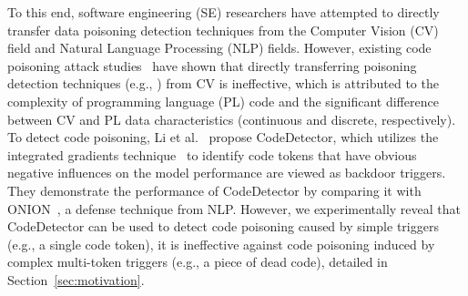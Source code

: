 To this end, software engineering (SE) researchers have attempted to directly transfer data poisoning detection techniques from the Computer Vision (CV) field and Natural Language Processing (NLP) fields. However, existing code poisoning attack studies~\cite{2022-you-see-what-I-want-you-to-see, 2023-BADCODE} have shown that directly transferring poisoning detection techniques (e.g., ) from CV is ineffective, which is attributed to the complexity of programming language (PL) code and the significant difference between CV and PL data characteristics (continuous and discrete, respectively). 
To detect code poisoning, Li et al.~\cite{2024-Poison-Attack-and-Poison-Detection-on-Deep-Source-Code-Processing-Models} propose CodeDetector, which utilizes the integrated gradients technique~\cite{2017-Axiomatic-Attribution-for-Deep-Networks} to identify code tokens that have obvious negative influences on the model performance are viewed as backdoor triggers. 
They demonstrate the performance of CodeDetector by comparing it with ONION~\cite{2021-ONION}, a defense technique from NLP. 
However, we experimentally reveal that CodeDetector can be used to detect code poisoning caused by simple triggers (e.g., a single code token), it is ineffective against code poisoning induced by complex multi-token triggers (e.g., a piece of dead code), detailed in Section~\ref{sec:motivation}. 


